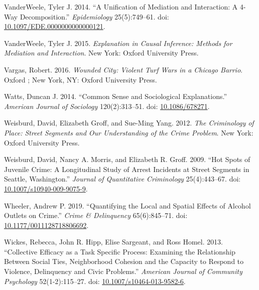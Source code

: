 \documentclass [11pt, proquest] {uwthesis}[2015/03/03]
\newlength{\cslhangindent}
\newenvironment{CSLReferences}[2]%
{\setlength{\parindent}{0pt}%
\everypar{\setlength{\hangindent}{\cslhangindent}}\ignorespaces}%
{\par}
\begin{document}
\begin{CSLReferences}{1}{0}
\leavevmode\hypertarget{ref-vanderweeleUnificationMediationInteraction2014}{}%
VanderWeele, Tyler J. 2014. {``A {Unification} of {Mediation} and {Interaction}: {A} 4-{Way Decomposition}.''} \emph{Epidemiology} 25(5):749--61. doi: \href{https://doi.org/10.1097/EDE.0000000000000121}{10.1097/EDE.0000000000000121}.

\leavevmode\hypertarget{ref-vanderweeleExplanationCausalInference2015}{}%
VanderWeele, Tyler J. 2015. \emph{Explanation in Causal Inference: Methods for Mediation and Interaction}. {New York}: {Oxford University Press}.

\leavevmode\hypertarget{ref-vargasWoundedCityViolent2016}{}%
Vargas, Robert. 2016. \emph{Wounded City: Violent Turf Wars in a {Chicago} Barrio}. {Oxford ; New York, NY}: {Oxford University Press}.

\leavevmode\hypertarget{ref-wattsCommonSenseSociological2014}{}%
Watts, Duncan J. 2014. {``Common {Sense} and {Sociological Explanations}.''} \emph{American Journal of Sociology} 120(2):313--51. doi: \href{https://doi.org/10.1086/678271}{10.1086/678271}.

\leavevmode\hypertarget{ref-weisburdCriminologyPlaceStreet2012}{}%
Weisburd, David, Elizabeth Groff, and Sue-Ming Yang. 2012. \emph{The Criminology of Place: Street Segments and Our Understanding of the Crime Problem}. {New York}: {Oxford University Press}.

\leavevmode\hypertarget{ref-weisburdHotSpotsJuvenile2009}{}%
Weisburd, David, Nancy A. Morris, and Elizabeth R. Groff. 2009. {``Hot {Spots} of {Juvenile Crime}: {A Longitudinal Study} of {Arrest Incidents} at {Street Segments} in {Seattle}, {Washington}.''} \emph{Journal of Quantitative Criminology} 25(4):443--67. doi: \href{https://doi.org/10.1007/s10940-009-9075-9}{10.1007/s10940-009-9075-9}.

\leavevmode\hypertarget{ref-wheelerQuantifyingLocalSpatial2019}{}%
Wheeler, Andrew P. 2019. {``Quantifying the {Local} and {Spatial Effects} of {Alcohol Outlets} on {Crime}.''} \emph{Crime \& Delinquency} 65(6):845--71. doi: \href{https://doi.org/10.1177/0011128718806692}{10.1177/0011128718806692}.

\leavevmode\hypertarget{ref-wickesCollectiveEfficacyTask2013}{}%
Wickes, Rebecca, John R. Hipp, Elise Sargeant, and Ross Homel. 2013. {``Collective {Efficacy} as a {Task Specific Process}: {Examining} the {Relationship Between Social Ties}, {Neighborhood Cohesion} and the {Capacity} to {Respond} to {Violence}, {Delinquency} and {Civic Problems}.''} \emph{American Journal of Community Psychology} 52(1-2):115--27. doi: \href{https://doi.org/10.1007/s10464-013-9582-6}{10.1007/s10464-013-9582-6}.


\end{CSLReferences}
\end{document}
